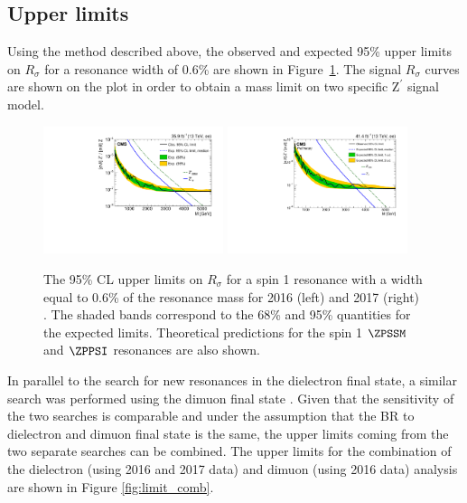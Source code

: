 \subsection{Upper limits}
Using the method described above, the observed and expected 95\% upper limits on $R_\sigma$ for a resonance width of 0.6\% are shown in Figure~\ref{fig:limit_ee}.
The signal $R_{\sigma}$ curves are shown on the plot in order to obtain a mass limit on two specific $\mathrm{Z}^{'}$ signal model.

\begin{figure}[!htb]
\centering
\includegraphics[width=0.47\textwidth]{figures/Zprime/2016/paper/Figure_003-a.pdf}
\includegraphics[width=0.47\textwidth]{figures/Zprime/2017/limitInputs/limitPlot_Dielectron2017_forApproval.pdf}
 \caption{The 95\% CL upper limits on $R_\sigma$ for a spin 1 resonance with a width equal to 0.6\% of the resonance mass for 2016 (left) \cite{Sirunyan2018} and 2017 (right) \cite{CMS-PAS-EXO-18-006}. The shaded bands correspond to the 68\% and 95\% quantities for the expected limits.  Theoretical predictions for the spin 1 $\ZPSSM$ and $\ZPPSI$ resonances are also shown.}
\label{fig:limit_ee}
\end{figure}

\medskip
In parallel to the search for new resonances in the dielectron final state, a similar search was performed using the dimuon final state \cite{CMS-AN-2016-391}.
Given that the sensitivity of the two searches is comparable and under the assumption that the BR to dielectron and dimuon final state is the same, the upper limits coming from the two separate searches can be combined. The upper limits for the combination of the dielectron (using 2016 and 2017 data) and dimuon (using 2016 data) analysis are shown in Figure \ref{fig:limit_comb}.

